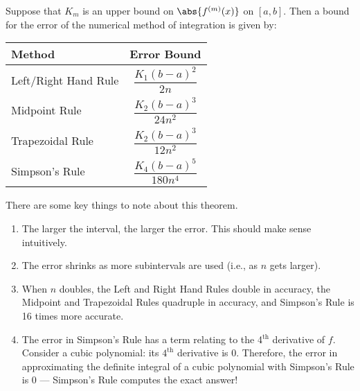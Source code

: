 \begin{theorem}\label{thm:numerical_error}%
Suppose that $K_m$ is an upper bound on $\abs{f^{(m)}(x)}$ on $[a,b]$.  Then a bound for the error of the numerical method of integration is given by:
\begin{center}
\begin{tabular}{lc}
Method & Error Bound \\\midrule
Left/Right Hand Rule & $\dfrac{K_1(b-a)^2}{2n}$ \\\addlinespace
Midpoint Rule & $\dfrac{K_2(b-a)^3}{24n^2}$ \\\addlinespace
Trapezoidal Rule & $\dfrac{K_2(b-a)^3}{12n^2}$ \\\addlinespace
Simpson's Rule & $\dfrac{K_4(b-a)^5}{180n^4}$
\end{tabular}
\end{center}
\end{theorem}

There are some key things to note about this theorem.
\begin{enumerate}
	\item	The larger the interval, the larger the error. This should make sense intuitively.
	\item	The error shrinks as more subintervals are used (i.e., as $n$ gets larger).
	\item	When $n$ doubles, the Left and Right Hand Rules double in accuracy, the Midpoint and Trapezoidal Rules quadruple in accuracy, and Simpson's Rule is 16 times more accurate.
	\item	The error in Simpson's Rule has a term relating to the 4$^{\text{th}}$ derivative of $f$. Consider a cubic polynomial: its $4^{\text{th}}$ derivative is 0. Therefore, the error in approximating the definite integral of a cubic polynomial with Simpson's Rule is 0 --- Simpson's Rule computes the exact answer!
\end{enumerate}

